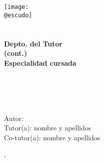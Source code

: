 \begin{titlepage}
    \makeatletter
	\begin{center}
		\texttt{[image: \\@escudo]}\\[1.5cm]
		
		{\LARGE \textbf{\@instEdu \\[0.5ex]
				\@centroEdu}}\\[0.5cm]
		{\Large \textbf{Depto. del Tutor}}\\ \smallskip%
        {\Large\textbf{(cont.)}}\\[0.5cm]
		{\large \textbf{Especialidad cursada}}\\[1.5cm]
		{\LARGE \textbf{\@tipoDoc}}\\[1cm]
		
		
		{\LARGE \textbf{\@tituloPrimera}}\\ \smallskip%
		\ifdefined\@tituloSegunda{\LARGE \textbf{\@tituloSegunda}}\\[3cm]
		\else \phantom{\LARGE Texto fantasma}\\[3cm]
		\fi
	\end{center}
	\begin{flushleft}
		{\Large Autor: \@autor} \\ \bigskip%
		{\Large Tutor(a): nombre y apellidos} \\ \bigskip%
		{\Large Co-tutor(a): nombre y apellidos}
	\end{flushleft}
	\vfill%
	
	\begin{flushright}
		{\Large \@mesDefensa, \@yearDefensa}
	\end{flushright}
	\cleardoublepage
    \makeatother
\end{titlepage}
	










